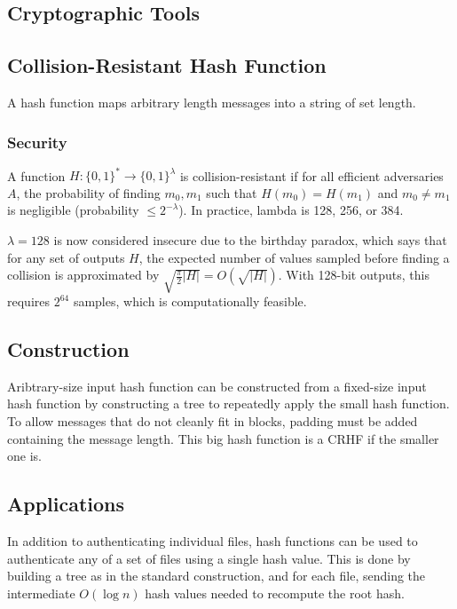 \documentclass{article}
\begin{document}
\begin{multicols*}{2}
\tableofcontents

	\section{Cryptographic Tools}
	\subsection{Collision-Resistant Hash Function}

	A hash function maps arbitrary length messages into a string of set length.
	\subsubsection{Security}
	A function $H: \{0, 1\}^* \rightarrow \{0, 1\}^\lambda$ is collision-resistant if for all efficient adversaries $A$, the probability of finding $m_0, m_1$ such that $H(m_0) = H(m_1)$ and $m_0 \neq m_1$ is negligible (probability $\leq 2^{-\lambda}$). In practice, lambda is 128, 256, or 384.

	$\lambda = 128$ is now considered insecure due to the birthday paradox, which says that for any set of outputs $H$, the expected number of values sampled before finding a collision is approximated by $\sqrt{\frac{\pi}{2}|H|} = O(\sqrt{|H|})$. With 128-bit outputs, this requires $2^64$ samples, which is computationally feasible.

	\subsection{Construction}
	Aribtrary-size input hash function can be constructed from a fixed-size input hash function by constructing a tree to repeatedly apply the small hash function. To allow messages that do not cleanly fit in blocks, padding must be added containing the message length. This big hash function is a CRHF if the smaller one is.

	\subsection{Applications}
	In addition to authenticating individual files, hash functions can be used to authenticate any of a set of files using a single hash value. This is done by building a tree as in the standard construction, and for each file, sending the intermediate $O(\log n)$ hash values needed to recompute the root hash.


\end{multicols*}
\end{document}
